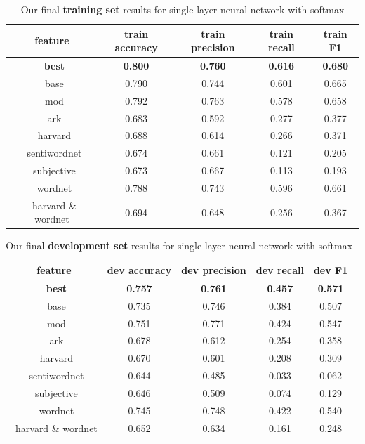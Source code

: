 \documentclass[11pt,letterpaper]{article}
\begin{document}
\clearpage


\begin{table}[htp]
\begin{center}
\begin{tabularx}{374pt}{|c|c|c|c|c|}
\hline
\bf feature & \bf train accuracy & \bf train precision &\bf train recall &\bf train F1 \\
\hline
\ \bf best &\bf 0.800 &\bf 0.760 &\bf 0.616 &\bf 0.680 \\
\ base & 0.790 & 0.744 & 0.601 & 0.665 \\
\ mod & 0.792 & 0.763 & 0.578 & 0.658 \\
\ ark & 0.683 & 0.592 & 0.277 & 0.377 \\
\ harvard & 0.688 & 0.614 & 0.266 & 0.371 \\
\ sentiwordnet & 0.674 & 0.661 & 0.121 & 0.205 \\
\ subjective & 0.673 & 0.667 & 0.113 & 0.193 \\
\ wordnet & 0.788 & 0.743 & 0.596 & 0.661 \\
\ harvard \& wordnet & 0.694 & 0.648 & 0.256 & 0.367 \\
\hline
\end{tabularx}
\end{center}
\caption{\label{final-results-train} Our final {\bf training set} results for single layer neural network with softmax }
\end{table}

\begin{table}[htp]
\begin{center}
\begin{tabularx}{347pt}{|c|c|c|c|c|}
\hline
\bf feature & \bf dev accuracy &\bf dev precision &\bf dev recall & \bf dev F1 \\
\hline
\ \bf best &\bf 0.757 &\bf 0.761 &\bf 0.457 &\bf 0.571 \\
\ base & 0.735 & 0.746 & 0.384 & 0.507 \\
\ mod & 0.751 & 0.771 & 0.424 & 0.547 \\
\ ark & 0.678 & 0.612 & 0.254 & 0.358 \\
\ harvard & 0.670 & 0.601 & 0.208 & 0.309 \\
\ sentiwordnet & 0.644 & 0.485 & 0.033 & 0.062 \\
\ subjective & 0.646 & 0.509 & 0.074 & 0.129 \\
\ wordnet & 0.745 & 0.748 & 0.422 & 0.540 \\
\ harvard \& wordnet & 0.652 & 0.634 & 0.161 & 0.248 \\
\hline
\end{tabularx}
\end{center}
\caption{\label{final-results-dev} Our final {\bf development set} results for single layer neural network with softmax }
\end{table}
\end{document}
